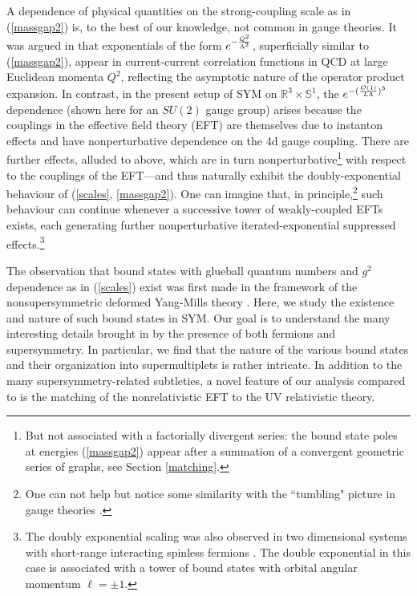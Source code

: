 \documentclass[11pt]{article}
\def\R{{\mathbb R}}
\def\S{{\mathbb S}}
\begin{document}
A dependence of physical quantities on the strong-coupling scale as in (\ref{massgap2}) is, to the best of our knowledge, not common in gauge theories. It was argued in \cite{Shifman:1994yf} that exponentials of the form $e^{- {Q^2 \over \Lambda^2}}$, superficially similar to (\ref{massgap2}), appear in current-current correlation functions   in QCD at large Euclidean momenta $Q^2$, reflecting  the asymptotic nature of the operator product expansion. 
In contrast, in the present setup of SYM on $\R^3 \times \S^1$, the  $e^{- ({{\cal{O}}(1)\over  L \Lambda})^3}$  dependence (shown here for an $SU(2)$ gauge group)   arises because the couplings in the effective field theory (EFT) are themselves due to instanton effects and have nonperturbative dependence on the 4d gauge coupling.  There are further effects, alluded to above, which are in turn  nonperturbative\footnote{But   not associated with a factorially divergent series: the bound state poles  at energies (\ref{massgap2}) appear after a summation of a convergent geometric series of graphs, see Section \ref{matching}.} with respect to the couplings of the EFT---and thus naturally exhibit the doubly-exponential behaviour of (\ref{scales}, \ref{massgap2}). One can imagine that, in principle,\footnote{One can not help but notice some similarity with the ``tumbling" picture in gauge theories \cite{Raby:1979my}.} such   behaviour can continue whenever a successive tower of weakly-coupled EFTs exists, each generating further nonperturbative iterated-exponential  suppressed effects.\footnote{The doubly exponential scaling was also observed in two dimensional systems with short-range interacting spinless fermions \cite{ Moroz:2013kf}. The double exponential in this case is associated with a tower of bound states with orbital angular momentum $\ell=\pm1$.}

The observation that bound states with  glueball quantum numbers  and $g^2$ dependence as in (\ref{scales})  exist was first made in the framework of the nonsupersymmetric deformed Yang-Mills theory \cite{Aitken:2017ayq}. Here, we study the existence and nature of such bound states  in SYM. Our goal is to understand the many interesting details brought in by the presence of both fermions and supersymmetry. In particular, we find that the nature of the various bound states and their organization into supermultiplets is rather intricate.  In addition to the many supersymmetry-related subtleties, a novel feature of our analysis compared to  \cite{Aitken:2017ayq} is the  matching of the nonrelativistic EFT to the UV relativistic theory.
\end{document}
